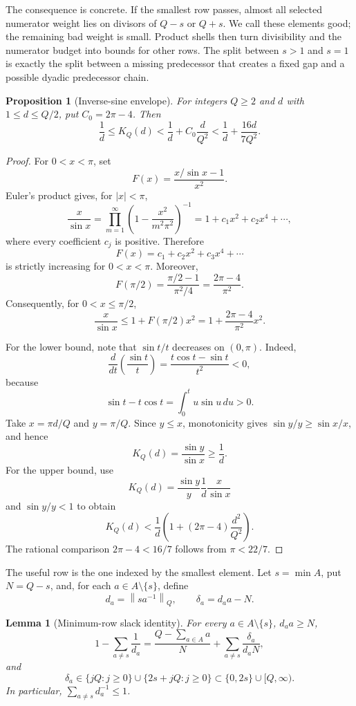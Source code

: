 \documentclass[11pt]{article}
\newtheorem{proposition}[theorem]{Proposition}
\newtheorem{lemma}[theorem]{Lemma}
\theoremstyle{definition}
\theoremstyle{remark}
\newcommand{\normQ}[1]{\left\lVert #1\right\rVert_Q}
\begin{document}
The consequence is concrete.  If the smallest row passes, almost all
selected numerator weight lies on divisors of \(Q-s\) or \(Q+s\).  We call
these elements good; the remaining bad weight is small.  Product shells then
turn divisibility and the numerator budget into bounds for other rows.  The
split between \(s>1\) and \(s=1\) is exactly the split between a missing
predecessor that creates a fixed gap and a possible dyadic predecessor chain.

\begin{proposition}[Inverse-sine envelope]\label{prop:kernel}
For integers \(Q\ge2\) and \(d\) with \(1\le d\le Q/2\), put
\(C_0=2\pi-4\).  Then
\begin{equation}\label{eq:kernel-envelope}
 \frac1d\le K_Q(d)
 <\frac1d+C_0\frac d{Q^2}
 <\frac1d+\frac{16d}{7Q^2}.
\end{equation}
\end{proposition}

\begin{proof}
For \(0<x<\pi\), set
\[
 F(x)=\frac{x/\sin x-1}{x^2}.
\]
Euler's product gives, for \(|x|<\pi\),
\[
 \frac{x}{\sin x}
 =\prod_{m=1}^{\infty}
  \left(1-\frac{x^2}{m^2\pi^2}\right)^{-1}
 =1+c_1x^2+c_2x^4+\cdots,
\]
where every coefficient \(c_j\) is positive.  Therefore
\[
 F(x)=c_1+c_2x^2+c_3x^4+\cdots
\]
is strictly increasing for \(0<x<\pi\).  Moreover,
\[
 F(\pi/2)=\frac{\pi/2-1}{\pi^2/4}
          =\frac{2\pi-4}{\pi^2}.
\]
Consequently, for \(0<x\le\pi/2\),
\[
 \frac{x}{\sin x}\le1+F(\pi/2)x^2
 =1+\frac{2\pi-4}{\pi^2}x^2.
\]

For the lower bound, note that \(\sin t/t\) decreases on
\((0,\pi)\).  Indeed,
\[
 \frac{d}{dt}\left(\frac{\sin t}{t}\right)
 =\frac{t\cos t-\sin t}{t^2}<0,
\]
because
\[
 \sin t-t\cos t=\int_0^t u\sin u\,du>0.
\]
Take \(x=\pi d/Q\) and \(y=\pi/Q\).  Since \(y\le x\), monotonicity
gives \(\sin y/y\ge\sin x/x\), and hence
\[
 K_Q(d)=\frac{\sin y}{\sin x}\ge\frac1d.
\]
For the upper bound, use
\[
 K_Q(d)=\frac{\sin y}{y}\frac1d\frac{x}{\sin x}
\]
and \(\sin y/y<1\) to obtain
\[
 K_Q(d)<\frac1d\left(1+(2\pi-4)\frac{d^2}{Q^2}\right).
\]
The rational comparison
\(2\pi-4<16/7\) follows from \(\pi<22/7\).
\end{proof}

The useful row is the one indexed by the smallest element.  Let
\(s=\min A\), put \(N=Q-s\), and, for each
\(a\in A\setminus\{s\}\), define
\[
 d_a=\normQ{sa^{-1}},\qquad \delta_a=d_aa-N.
\]

\begin{lemma}[Minimum-row slack identity]\label{lem:slack}
For every \(a\in A\setminus\{s\}\),
\(d_aa\ge N\),
\begin{equation}\label{eq:slack}
 1-\sum_{a\ne s}\frac1{d_a}
 =\frac{Q-\sum_{a\in A}a}{N}
 +\sum_{a\ne s}\frac{\delta_a}{d_aN},
\end{equation}
and
\begin{equation}\label{eq:discrete-gap}
 \delta_a\in\{jQ:j\ge0\}\cup\{2s+jQ:j\ge0\}
 \subset\{0,2s\}\cup[Q,\infty).
\end{equation}
In particular, \(\sum_{a\ne s}d_a^{-1}\le1\).
\end{lemma}
\end{document}
